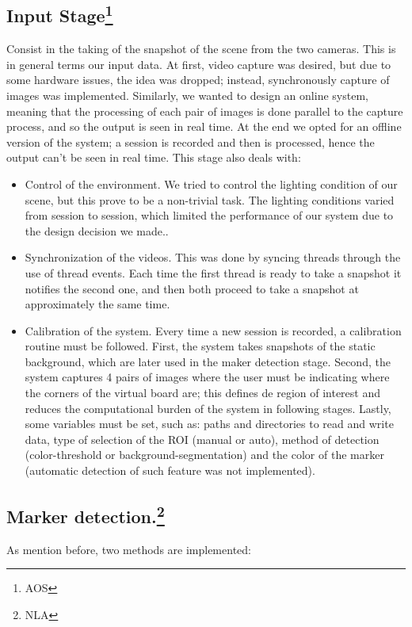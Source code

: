 \documentclass[a4paper,12pt]{article}
\begin{document}
\subsection[Input Stage.]{Input Stage\footnote{AOS}}
Consist in the taking of the snapshot of the scene from the two cameras. This is in general terms our input data. At first, video capture was desired, but due to some hardware issues, the idea was dropped; instead, synchronously capture of images was implemented. Similarly, we wanted to design an online system, meaning that the processing of each pair of images is done parallel to the capture process, and so the output is seen in real time. At the end we opted for an offline version of the system; a session is recorded and then is processed, hence the output can't be seen in real time. 
This stage also deals with:
\begin{itemize}
        \item Control of the environment. We tried to control the lighting condition of our scene, but this prove to be a non-trivial task. The lighting conditions varied from session to session, which limited the performance of our system due to the design decision we made..
        \item Synchronization of the videos. This was done by syncing threads through the use of thread events. Each time the first thread is ready to take a snapshot it notifies the second one, and then both proceed to take a snapshot at approximately the same time.
        \item Calibration of the system. Every time a new session is recorded, a calibration routine must be followed. First, the system takes snapshots of the static background, which are later used in the maker detection stage. Second, the system captures 4 pairs of images where the user must be indicating where the corners of the virtual board are; this defines de region of interest and reduces the computational burden of the system in following stages. Lastly, some variables must be set, such as: paths and directories to read and write data, type of selection of the ROI (manual or auto), method of detection (color-threshold or background-segmentation) and the color of the marker (automatic detection of such feature was not implemented).
\end{itemize}

\subsection[Marker detection.]{Marker detection.\footnote{NLA}}
As mention before, two methods are implemented:
\end{document}
